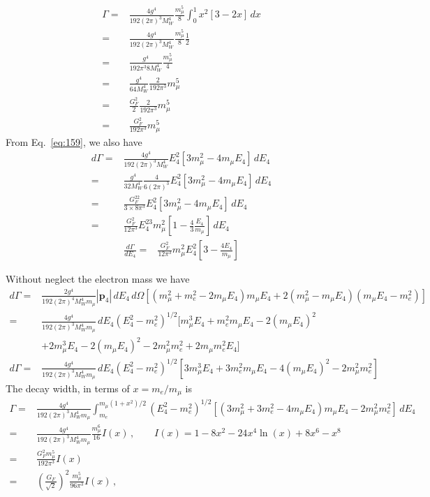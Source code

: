 \begin{align}
  \Gamma=&\frac{4g^4}{192 (2\pi)^3 M_W^4 }\frac{m_\mu^5}{8}\int_0^1x^2[3-2x]\,d x\nonumber\\
  =&\frac{4g^4}{192 (2\pi)^3 M_W^4 }\frac{m_\mu^5}{8}\frac{1}{2}\nonumber\\
  =&\frac{g^4}{192 \pi^3 8M_W^4 }\frac{m_\mu^5}{4}\nonumber\\
  =&\frac{g^4}{64 M_W^4 }\frac{2}{192 \pi^3}m_\mu^5\nonumber\\
  =&\frac{G_F^2}{2}\frac{2}{192 \pi^3}m_\mu^5\nonumber\\
  =&\frac{G_F^2}{192 \pi^3}m_\mu^5
\end{align}
From Eq.~\eqref{eq:159}, we also have
\begin{align}
  d\Gamma=&\frac{4g^4}{192 (2\pi)^3 M_W^4 }E_4^2\left[3m_\mu^2-4m_\mu E_4\right]\,d E_4\nonumber\\
=&\frac{g^4}{32M_W^4}\frac{4}{6 (2\pi)^3}E_4^2\left[3m_\mu^2-4m_\mu E_4\right]\,d E_4\nonumber\\
=&\frac{G_F^22}{3\times8\pi^3}E_4^2\left[3m_\mu^2-4m_\mu E_4\right]\,d E_4\nonumber\\
=&\frac{G_F^2}{12\pi^3}E_4^23m_\mu^2\left[1-\frac{4}{3}\frac{E_4}{m_\mu}\right]\,d E_4
\end{align}
\begin{align}
  \frac{d\Gamma}{d E_4}=
&\frac{G_F^2}{12\pi^3}m_\mu^2E_4^2\left[3-\frac{4E_4}{m_\mu}\right]
\end{align}


Without neglect the electron mass we have
\begin{align}
  d\Gamma=&\frac{2g^4}{192 (2\pi)^4 M_W^4 m_\mu }|\mathbf{p}_4|\,d E_4\,d\Omega[(m_\mu^2+m_e^2-2m_\mu E_4)m_\mu E_4 
  +2(m_\mu^2-m_\mu E_4)(m_\mu E_4-m_e^2)]\nonumber\\
  =&\frac{4g^4}{192 (2\pi)^3 M_W^4 m_\mu }\,d E_4(E_4^2-m_e^2)^{1/2}[m_\mu^3 E_4+m_e^2m_\mu E_4-2(m_\mu E_4)^2 \nonumber\\
  &+2m_\mu^3 E_4-2(m_\mu E_4)^2-2m_\mu^2m_e^2+2m_\mu m_e^2 E_4]\nonumber\\
 d\Gamma =&\frac{4g^4}{192 (2\pi)^3 M_W^4 m_\mu }\,d E_4(E_4^2-m_e^2)^{1/2}[3m_\mu^3 E_4+3 m_e^2m_\mu E_4-4(m_\mu E_4)^2 
  -2m_\mu^2m_e^2]
\end{align}
The decay width, in terms of $x=m_e/m_\mu$ is
\begin{align}
  \label{eq:120}
 \Gamma =&\frac{4g^4}{192 (2\pi)^3 M_W^4 m_\mu }\int_{m_e}^{m_\mu(1+x^2)/2}(E_4^2-m_e^2)^{1/2}[(3m_\mu^2+3 m_e^2-4m_\mu E_4)m_\mu E_4
  -2m_\mu^2m_e^2]\,d E_4\nonumber\\
=&\frac{4g^4}{192 (2\pi)^3 M_W^4 m_\mu }\frac{m_\mu^6}{16}I\left(x\right)\,,\qquad I(x)=1-8x^2-24x^4\ln(x)+8x^6-x^8\nonumber\\
 =&\frac{G_F^2 m_\mu^5}{192\pi^3}I\left(x\right)\nonumber\\
=&\left(\frac{G_F}{\sqrt{2}}\right)^2\frac{m_\mu^5}{96\pi^3}I\left(x\right)\,,
\end{align}

